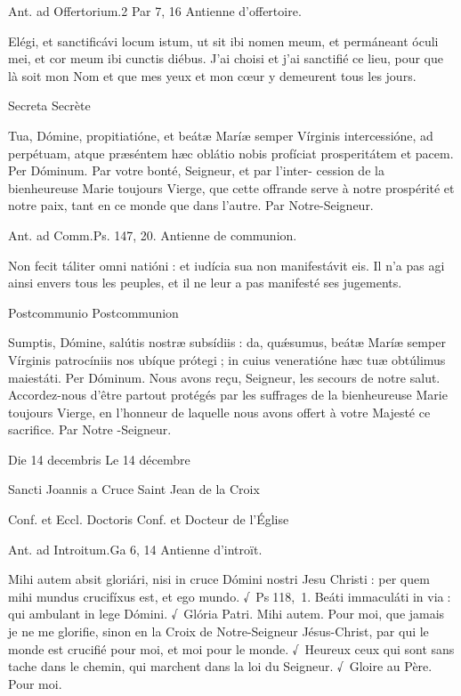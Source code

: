 \begin{paracol}{2}
Ant. ad Offertorium.\hfill 2 Par 7, 16
\switchcolumn
Antienne d’offertoire.
\switchcolumn*

Elégi, et sanctificávi locum istum, ut sit ibi nomen meum, et permáneant óculi mei, et cor meum ibi cunctis diébus.
\switchcolumn
J’ai choisi et j’ai sanctifié ce lieu, pour que là soit mon Nom et que mes yeux et mon cœur y demeurent tous les jours.
\switchcolumn*

Secreta
\switchcolumn
Secrète
\switchcolumn*

Tua, Dómine, propitiatióne, et beátæ Maríæ semper Vírginis intercessióne, ad perpétuam, atque præséntem hæc oblátio nobis profíciat prosperitátem et pacem. Per Dóminum.
\switchcolumn
Par votre bonté, Seigneur, et par l’inter- cession de la bienheureuse Marie toujours Vierge, que cette offrande serve à notre prospérité et notre paix, tant en ce monde que dans l’autre. Par Notre-Seigneur.
\switchcolumn*

Ant. ad Comm.\hfill Ps. 147, 20.
\switchcolumn
Antienne de communion.
\switchcolumn*

Non fecit táliter omni natióni : et iudícia sua non manifestávit eis.
\switchcolumn
Il n’a pas agi ainsi envers tous les peuples, et il ne leur a pas manifesté ses jugements.
\switchcolumn*

Postcommunio
\switchcolumn
Postcommunion
\switchcolumn*

Sumptis, Dómine, salútis nostræ subsídiis : da, quǽsumus, beátæ Maríæ semper Vírginis patrocíniis nos ubíque prótegi ; in cuius veneratióne hæc tuæ obtúlimus maiestáti. Per Dóminum.
\switchcolumn
Nous avons reçu, Seigneur, les secours  de notre salut. Accordez-nous d’être partout protégés par les suffrages de la bienheureuse Marie toujours Vierge, en l’honneur de laquelle nous avons offert à votre Majesté ce sacrifice. Par Notre -Seigneur.
\switchcolumn*

Die 14 decembris
\switchcolumn
Le 14 décembre
\switchcolumn*

Sancti Joannis a Cruce
\switchcolumn
Saint Jean de la Croix
\switchcolumn*

Conf. et Eccl. Doctoris
\switchcolumn
Conf. et Docteur de l’Église
\switchcolumn*

Ant. ad Introitum.\hfill Ga 6, 14
\switchcolumn
Antienne d’introït.
\switchcolumn*

Mihi autem absit gloriári, nisi  in cruce Dómini nostri Jesu Christi : per quem mihi mundus crucifíxus est, et ego mundo. √~Ps 118, 1. Beáti immaculáti in via : qui ambulant in lege Dómini. √~Glória Patri. Mihi autem.
\switchcolumn
Pour moi, que jamais je ne me glorifie, sinon en la Croix de Notre-Seigneur Jésus-Christ, par qui le monde est crucifié pour moi, et moi pour le monde. √~Heureux ceux qui sont sans tache dans le chemin, qui marchent dans la loi du Seigneur. √~Gloire au Père. Pour moi.
\switchcolumn*


\end{paracol}
